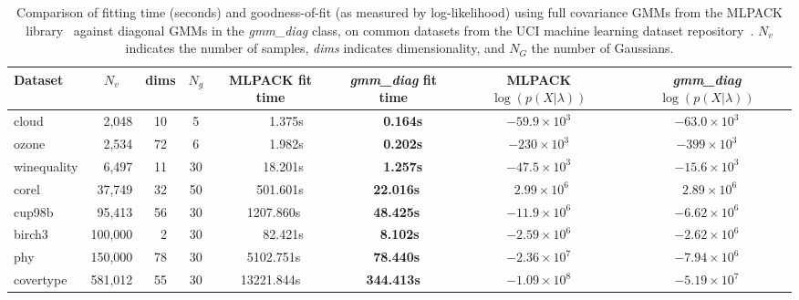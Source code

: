 \begin{table*}
\centering
\small
\begin{tabular}{|l|c|c|c|c|c|c|c|}
\hline
{\bf Dataset} & {\bf $N_v$} & {\bf dims} & {\bf $N_g$} & {\bf MLPACK fit time} & {\bfseries {\it\bfseries gmm\_diag} fit time} & {\bf MLPACK $\log(p(X|\lambda))$} & {\bf {\it\bfseries gmm\_diag} $\log(p(X|\lambda))$} \\
\hline
  cloud       & ~~2,048 & 10 &  5 & ~~~~~1.375s & ~~~{\bf 0.164s} & $-59.9  \times 10^{3}$ & $-63.0  \times 10^{3}$ \\
  ozone       & ~~2,534 & 72 &  6 & ~~~~~1.982s & ~~~{\bf 0.202s} & $-230   \times 10^{3}$ & $-399   \times 10^{3}$ \\
  winequality & ~~6,497 & 11 & 30 & ~~~~18.201s & ~~~{\bf 1.257s} & $-47.5  \times 10^{3}$ & $-15.6  \times 10^{3}$ \\
  corel       & ~37,749 & 32 & 50 & ~~~501.601s &  ~{\bf 22.016s} & $~~2.99 \times 10^{6}$ & $~~2.89 \times 10^{6}$ \\
  cup98b      & ~95,413 & 56 & 30 &  ~1207.860s &  ~{\bf 48.425s} & $-11.9  \times 10^{6}$ & $-6.62  \times 10^{6}$ \\
  birch3      & 100,000 & ~2 & 30 & ~~~~82.421s &  ~~{\bf 8.102s} & $-2.59  \times 10^{6}$ & $-2.62  \times 10^{6}$ \\
  phy         & 150,000 & 78 & 30 &  ~5102.751s &  ~{\bf 78.440s} & $-2.36  \times 10^{7}$ & $-7.94  \times 10^{6}$ \\
  covertype   & 581,012 & 55 & 30 &  13221.844s &  {\bf 344.413s} & $-1.09  \times 10^{8}$ & $-5.19  \times 10^{7}$ \\
\hline
\end{tabular}
\caption
  {
  Comparison of fitting time (seconds) and goodness-of-fit (as measured by log-likelihood) using full covariance GMMs from the MLPACK library~\cite{Curtin_2013}
  against diagonal GMMs in the {\it gmm\_diag} class,
  on common datasets from the UCI machine learning dataset repository~\cite{Lichman_2013}.
  $N_v$ indicates the number of samples, {\it dims} indicates dimensionality, and $N_G$ the number of Gaussians.
  }
\label{tab:results}
\end{table*}

